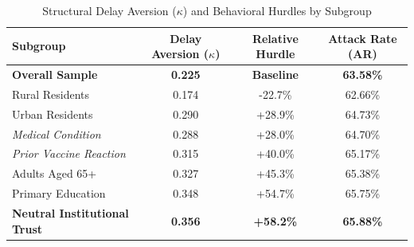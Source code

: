 \begin{table}[ht]
\centering
\caption{Structural Delay Aversion ($\kappa$) and Behavioral Hurdles by Subgroup}
\label{tab:subgroup_kappa}
\begin{tabular}{lccc}
\toprule
\textbf{Subgroup} & \textbf{Delay Aversion ($\kappa$)} & \textbf{Relative Hurdle} & \textbf{Attack Rate (AR)} \\
\midrule
\textbf{Overall Sample} & \textbf{0.225} & \textbf{Baseline} & \textbf{63.58\%} \\
Rural Residents & 0.174 & -22.7\% & 62.66\% \\
Urban Residents & 0.290 & +28.9\% & 64.73\% \\
\textit{Medical Condition} & 0.288 & +28.0\% & 64.70\% \\
\textit{Prior Vaccine Reaction} & 0.315 & +40.0\% & 65.17\% \\
Adults Aged 65+ & 0.327 & +45.3\% & 65.38\% \\
Primary Education & 0.348 & +54.7\% & 65.75\% \\
\textbf{Neutral Institutional Trust} & \textbf{0.356} & \textbf{+58.2\%} & \textbf{65.88\%} \\
\bottomrule
\end{tabular}
\end{table}

